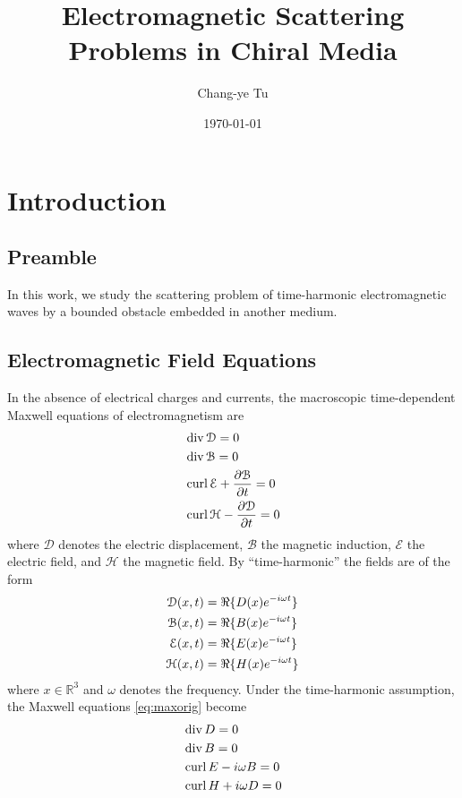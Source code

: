 
\author{Chang-ye Tu}
\title{Electromagnetic Scattering Problems in Chiral Media}
\date{\today}
\maketitle
\tableofcontents

\chapter{Introduction}

\section{Preamble}

In this work, we study the scattering problem of time-harmonic electromagnetic waves by a bounded obstacle embedded in another medium. 

\section{Electromagnetic Field Equations}

In the absence of electrical charges and currents, the macroscopic time-dependent Maxwell equations of electromagnetism are
\begin{equation}\label{eq:maxorig}
  \begin{split}
  &\operatorname{div}\mathcal{D} = 0 \\ 
  &\operatorname{div}\mathcal{B} = 0 \\
  &\operatorname{curl}\mathcal{E}+\frac{\partial\mathcal{B}}{\partial t} = 0 \\
  &\operatorname{curl}\mathcal{H}-\frac{\partial\mathcal{D}}{\partial t} = 0 
  \end{split}
\end{equation}
where $\mathcal{D}$ denotes the electric displacement, $\mathcal{B}$ the magnetic induction, $\mathcal{E}$ the electric field, and $\mathcal{H}$ the magnetic field. By ``time-harmonic'' the fields are of the form 
\begin{align*}
  \mathcal{D}(x, t) &= \operatorname{\Re}\{D(x)e^{-i\omega t}\}\\
  \mathcal{B}(x, t) &= \operatorname{\Re}\{B(x)e^{-i\omega t}\}\\ 
  \mathcal{E}(x, t) &= \operatorname{\Re}\{E(x)e^{-i\omega t}\}\\
  \mathcal{H}(x, t) &= \operatorname{\Re}\{H(x)e^{-i\omega t}\}\\ 
\end{align*}
where $x\in\mathbb{R}^3$ and $\omega$ denotes the frequency. Under the time-harmonic assumption, the Maxwell equations \eqref{eq:maxorig} become 
\begin{equation}\label{eq:maxhrm}
  \begin{split}
  &\operatorname{div} D = 0\\ 
  &\operatorname{div} B = 0\\
  &\operatorname{curl} E - i\omega B = 0\\
  &\operatorname{curl} H + i\omega D = 0 
  \end{split}
\end{equation}

